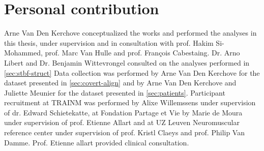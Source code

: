 \chapter*{Personal contribution}
Arne Van Den Kerchove conceptualized the works and performed the analyses in
this thesis, under supervision and in consultation with prof. Hakim Si-Mohammed,
prof. Marc Van Hulle and prof. François Cabestaing.
Dr. Arno Libert and Dr. Benjamin Wittevrongel consulted on the analyses performed in
\autoref{sec:stbf-struct}
Data collection was performed by Arne Van Den Kerchove for the dataset
presented in \autoref{sec:covert-align} and by Arne Van Den Kerchove and
Juliette Meunier for the dataset presented in \autoref{sec:patients}.
Participant recruitment at TRAINM was performed by Alixe Willemssens under
supervision of dr. Edward Schietekatte, at Fondation Partage et Vie by Marie de
Moura under supervision of prof. Etienne Allart and at UZ Leuven Neuromuscular reference
center under supervision of prof. Kristl Claeys and prof. Philip Van Damme.
Prof. Etienne allart provided clinical consultation.
